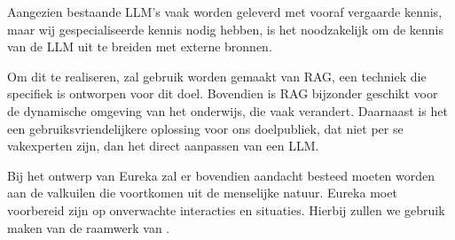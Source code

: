 Aangezien bestaande \acrshort{LLM}'s vaak worden geleverd met vooraf vergaarde kennis, maar wij gespecialiseerde kennis nodig hebben, is het noodzakelijk om de kennis van de \acrshort{LLM} uit te breiden met externe bronnen.

Om dit te realiseren, zal gebruik worden gemaakt van RAG, een techniek die specifiek is ontworpen voor dit doel. Bovendien is RAG bijzonder geschikt voor de dynamische omgeving van het onderwijs, die vaak verandert. Daarnaast is het een gebruiksvriendelijkere oplossing voor ons doelpubliek, dat niet per se vakexperten zijn, dan het direct aanpassen van een \acrshort{LLM}.

Bij het ontwerp van Eureka zal er bovendien aandacht besteed moeten worden aan de valkuilen die voortkomen uit de menselijke natuur. Eureka moet voorbereid zijn op onverwachte interacties en situaties. Hierbij zullen we gebruik maken van de raamwerk van \textcite{Taneja2024}.



